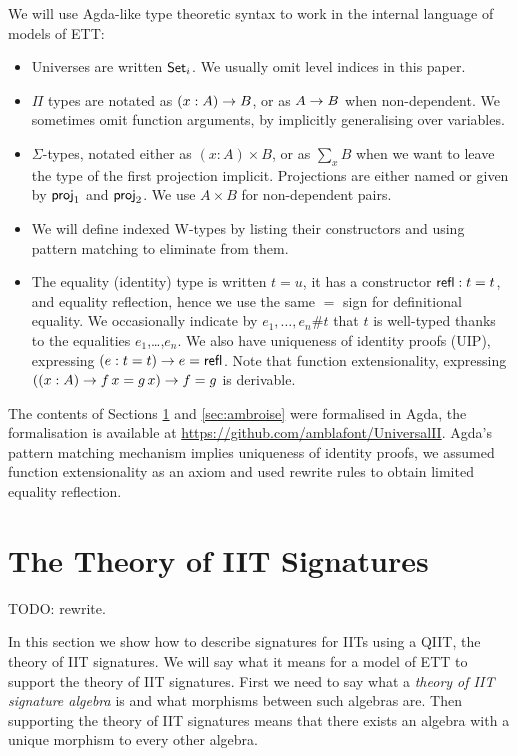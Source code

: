 \documentclass[a4paper,UKenglish,cleveref, autoref]{lipics-v2019}
\begin{document}
We will use Agda-like type theoretic syntax to work in the internal
language of models of ETT:
\begin{itemize}
\item Universes are written $\mathsf{Set}_i$. We usually omit level indices in this paper.
\item $\Pi$ types are notated as $(x : A)\rightarrow B$, or as $A \rightarrow B$ when
  non-dependent. We sometimes omit function arguments, by implicitly
  generalising over variables.
\item $\Sigma$-types, notated either as $(x : A)\times B$, or as
  $\sum\limits_{x} B$ when we want to leave the type of the first
  projection implicit. Projections are either named or given by
  $\mathsf{proj}_1$ and $\mathsf{proj}_2$. We use $A \times B$ for non-dependent
  pairs.
\item We will define indexed W-types \cite{indexedcont} by listing
  their constructors and using pattern matching to eliminate from
  them.
\item The equality (identity) type is written $t = u$, it has a
  constructor $\mathsf{refl} : t = t$, and equality reflection, hence we use
  the same $=$ sign for definitional equality. We occasionally
  indicate by $e_1,\dots,e_n \#t$ that $t$ is well-typed thanks to the
  equalities $e_1$,\dots,$e_n$. We also have uniqueness of identity
  proofs (UIP), expressing $(e : t = t)\rightarrow e = \mathsf{refl}$. Note that
  function extensionality, expressing
  $((x : A) \rightarrow f\,x = g\,x) \rightarrow f = g$ is derivable.
\end{itemize}

The contents of Sections \ref{sec:theory_of_signatures} and
\ref{sec:ambroise} were formalised in Agda, the formalisation is
available at \url{https://github.com/amblafont/UniversalII}. Agda's
pattern matching mechanism implies uniqueness of identity proofs, we
assumed function extensionality as an axiom and used rewrite rules
\cite{cockxsprinkles} to obtain limited equality reflection.


\section{The Theory of IIT Signatures}
\label{sec:theory_of_signatures}

TODO: rewrite.

In this section we show how to describe signatures for IITs using a
QIIT, the theory of IIT signatures. We will say what it means for a
model of ETT to support the theory of IIT signatures. First we need to
say what a \emph{theory of IIT signature algebra} is and what
morphisms between such algebras are. Then supporting the theory of IIT
signatures means that there exists an algebra with a unique morphism
to every other algebra.
\end{document}
